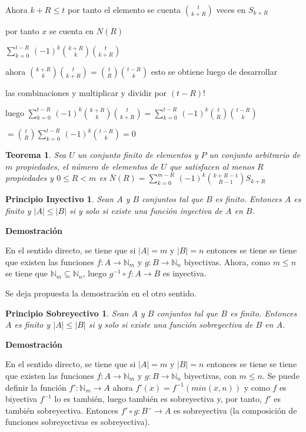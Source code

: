 \documentclass[a4paper,12pt]{report}
\newtheorem*{pin}{Principio Inyectivo}
\newtheorem*{pso}{Principio Sobreyectivo}
\newtheorem*{teo}{Teorema}
\begin{document}
Ahora $k+R\leq t$ por tanto el elemento se cuenta $t\choose{k+R}$ veces en $S_{k+R}$ 

por tanto $x$ se cuenta en $N(R)$
 
$\sum^{t-R}_{k=0}\, (-1)^k$${k+R}\choose{k}$${t}\choose{k+R}$

ahora ${k+R}\choose{k}$${t}\choose{k+R}$$=$${t}\choose{R}$${t-R}\choose{k}$ esto se obtiene luego de desarrollar 

las combinaciones y multiplicar y dividir por $(t-R)!$

luego $\sum^{t-R}_{k=0}\, (-1)^k$${k+R}\choose{k}$${t}\choose{k+R}$$=$$\sum^{t-R}_{k=0}\, (-1)^k$${t}\choose{R}$${t-R}\choose{k}$

$=$${t}\choose{R}$$\sum^{t-R}_{k=0}\, (-1)^k$${t-R}\choose{k}$$=0$

\begin{teo}
  Sea $U$ un conjunto finito de elementos y $P$ un conjunto arbitrario de $m$ propiedades, el número de elementos de $U$ que satisfacen al menos $R$ propiedades y $0\leq R < m$ es
 $\bar{N}(R) = \sum^{m-R}_{k=0}\, (-1)^k$${k+R-1}\choose{R-1}$$S_{k+R}$
\end{teo}

\begin{pin}
 Sean $A$ y $B$ conjuntos tal que $B$ es finito. Entonces $A$ es finito y $|A|\leq|B|$ si y solo si existe una función inyectiva de $A$ en $B$.
\end{pin}

\textbf{Demostración}

En el sentido directo, se tiene que si $|A|=m$ y $|B|=n$ entonces se tiene se tiene que existen las funciones $f:A\rightarrow\mathbb{N}_m$ y $g:B\rightarrow\mathbb{N}_n$ biyectivas. Ahora, como $m\leq n$ se tiene que $\mathbb{N}_m\subseteq\mathbb{N}_n$, luego $g^{-1} \circ f:A\rightarrow B$ es inyectiva.

Se deja propuesta la demostración en el otro sentido. 

\begin{pso}
 Sean $A$ y $B$ conjuntos tal que $B$ es finito. Entonces $A$ es finito y $|A|\leq|B|$ si y solo si existe una función sobreyectiva de $B$ en $A$.
\end{pso}

\textbf{Demostración}

En el sentido directo, se tiene que si $|A|=m$ y $|B|=n$ entonces se tiene se tiene que existen las funciones $f:A\rightarrow\mathbb{N}_m$ y $g:B\rightarrow\mathbb{N}_n$ biyectivas, con $m\leq n$. Se puede definir la función $f':\mathbb{N}_m\rightarrow A$ ahora $f'(x)=f^{-1}(min(x,n))$ y como $f$ es biyectiva $f^{-1}$ lo es también, luego también es sobreyectiva y, por tanto, $f'$ es también sobreyectiva. Entonces $f'\circ g:B¨\rightarrow A$ es sobreyectiva (la composición de funciones sobreyectivas es sobreyectiva).
\end{document}
